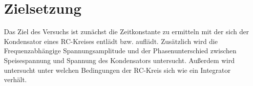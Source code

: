 \section{Zielsetzung}
\label{sec:Zielsetzung}

Das Ziel des Versuchs ist zunächst die Zeitkonstante zu ermitteln mit der sich der Kondensator eines RC-Kreises entlädt bzw. auflädt.
Zusätzlich wird die Frequenzabhängige Spannungsamplitude und der Phasenunterschied zwischen Speisespannung und Spannung des Kondensators untersucht.
Außerdem wird untersucht unter welchen Bedingungen der RC-Kreis sich wie ein Integrator verhält.